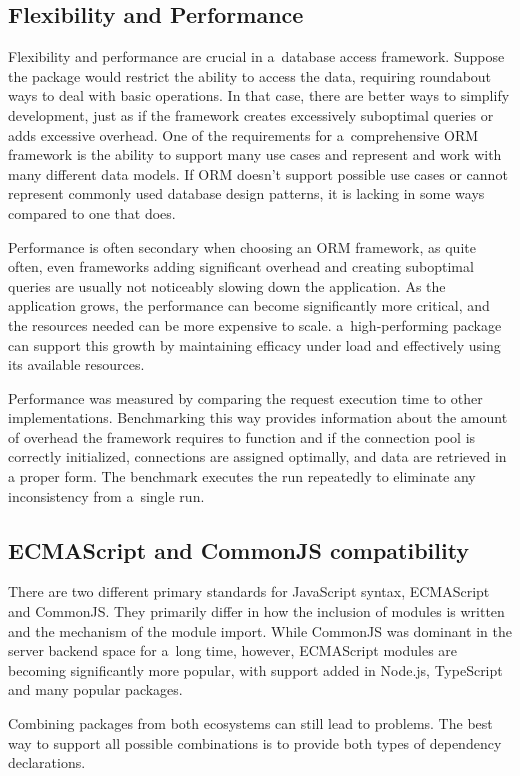 \subsection{Flexibility and Performance}

Flexibility and performance are crucial in a~database access framework. Suppose
the package would restrict the ability to access the data, requiring roundabout
ways to deal with basic operations. In that case, there are better ways to
simplify development, just as if the framework creates excessively suboptimal
queries or adds excessive overhead. One of the requirements for a~comprehensive
ORM framework is the ability to support many use cases and represent and work
with many different data models. If ORM doesn't support possible use cases or
cannot represent commonly used database design patterns, it is lacking in some
ways compared to one that does.

Performance is often secondary when choosing an ORM framework, as quite often,
even frameworks adding significant overhead and creating suboptimal queries are
usually not noticeably slowing down the application. As the application grows,
the performance can become significantly more critical, and the resources needed
can be more expensive to scale. a~high-performing package can support this
growth by maintaining efficacy under load and effectively using its available
resources.

Performance was measured by comparing the request execution time to other
implementations. Benchmarking this way provides information about the amount of
overhead the framework requires to function and if the connection pool is
correctly initialized, connections are assigned optimally, and data are
retrieved in a proper form. The benchmark executes the run repeatedly to
eliminate any inconsistency from a~single run.

\subsection{ECMAScript and CommonJS compatibility}
There are two different primary standards for JavaScript syntax, ECMAScript and
CommonJS. They primarily differ in how the inclusion of modules is written and
the mechanism of the module import. While CommonJS was dominant in the server
backend space for a~long time, however, ECMAScript modules are becoming
significantly more popular, with support added in Node.js, TypeScript and many
popular packages.

Combining packages from both ecosystems can still lead to problems. The best way
to support all possible combinations is to provide both types of dependency
declarations.

